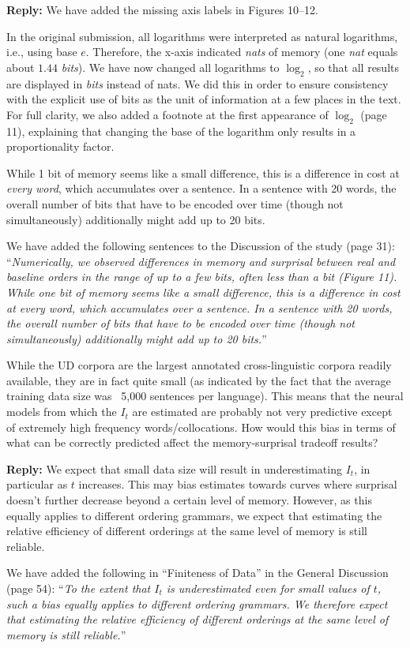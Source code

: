 \documentclass{article}[11pt,a4paper,oneside]
\newenvironment{reply}
  {\par\medskip
   \color{blue}%
   \begin{framed}
   \textbf{Reply: }\ignorespaces}
 {\end{framed}
  \medskip}
\begin{document}
\begin{reply}
We have added the missing axis labels in Figures 10--12.

In the original submission, all logarithms were interpreted as natural logarithms, i.e., using base $e$. Therefore, the x-axis indicated \emph{nats} of memory (one \emph{nat} equals about $1.44$ \emph{bits}).
	We have now changed all logarithms to $\log_2$, so that all results are displayed in \emph{bits} instead of nats.
	We did this in order to ensure consistency with the explicit use of bits as the unit of information at a few places in the text.
	For full clarity, we also added a footnote at the first appearance of $\log_2$ (page 11), explaining that changing the base of the logarithm only results in a proportionality factor.

	While 1 bit of memory seems like a small difference, this is a difference in cost at \emph{every word}, which accumulates over a sentence.
	In a sentence with 20 words, the overall number of bits that have to be encoded over time (though not simultaneously) additionally might add up to 20 bits.

	We have added the following sentences to the Discussion of the study (page 31):
	``\textit{Numerically, we observed differences in memory and surprisal between real and baseline
orders in the range of up to a few bits, often less than a bit (Figure 11). While one bit of
memory seems like a small difference, this is a difference in cost at every word, which
accumulates over a sentence. In a sentence with 20 words, the overall number of bits that
have to be encoded over time (though not simultaneously) additionally might add up to 20
	bits.}''
\end{reply}

While the UD corpora are the largest annotated cross-linguistic corpora readily available, they are in fact quite small (as indicated by the fact that the average training data size was ~5,000 sentences per language). This means that the neural models from which the $I_t$ are estimated are probably not very predictive except of extremely high frequency words/collocations. How would this bias in terms of what can be correctly predicted affect the memory-surprisal tradeoff results?

\begin{reply}
	We expect that small data size will result in underestimating $I_t$, in particular as $t$ increases. This may bias estimates towards curves where surprisal doesn't further decrease beyond a certain level of memory.
However, as this equally applies to different ordering grammars, we expect that estimating the relative efficiency of different orderings at the same level of memory is still reliable.

	We have added the following in ``Finiteness of Data'' in the General Discussion (page 54):
	``\textit{To the extent that $I_t$ is underestimated even for small values of $t$, such a bias equally applies to different ordering grammars. We therefore expect that estimating the relative efficiency of different orderings at the same level of memory is still reliable.}''
\end{reply}
\end{document}
